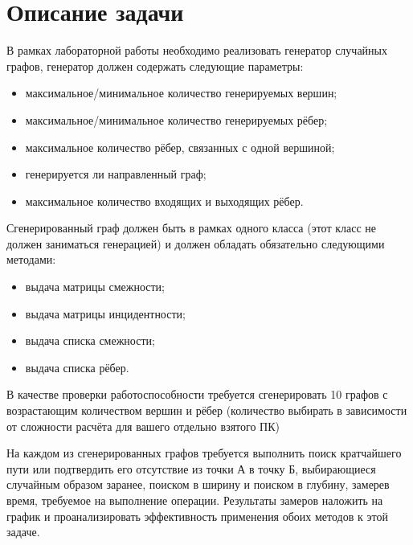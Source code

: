 \documentclass[12pt, a4paper]{report}
\begin{document}
	\section*{Описание задачи}
	\large
	В рамках лабораторной работы необходимо реализовать генератор случайных графов, генератор должен содержать следующие параметры:
	\begin{itemize}
		\item максимальное/минимальное количество генерируемых вершин;
		\item максимальное/минимальное количество генерируемых рёбер;
		\item максимальное количество рёбер, связанных с одной вершиной;
		\item генерируется ли направленный граф;
		\item максимальное количество входящих и выходящих рёбер.
	\end{itemize}
	\par
	Сгенерированный граф должен быть в рамках одного класса (этот класс не должен заниматься генерацией) и должен обладать обязательно следующими методами:
	\begin{itemize}
		\item выдача матрицы смежности;
		\item выдача матрицы инцидентности;
		\item выдача списка смежности;
		\item выдача списка рёбер.
	\end{itemize}
	\par
	В качестве проверки работоспособности требуется сгенерировать 10 графов с возрастающим количеством вершин и рёбер (количество выбирать в зависимости от сложности расчёта для вашего отдельно взятого ПК)
	\par
	На каждом из сгенерированных графов требуется выполнить поиск кратчайшего пути или подтвердить его отсутствие из точки А в точку Б, выбирающиеся случайным образом заранее, поиском в ширину и поиском в глубину, замерев время, требуемое на выполнение операции. Результаты замеров наложить на график и проанализировать эффективность применения обоих методов к этой задаче.
\end{document}
